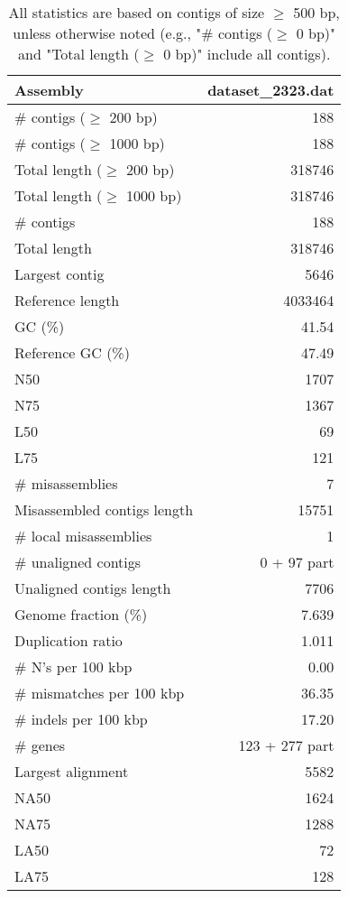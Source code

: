 \documentclass[12pt,a4paper]{article}
\begin{document}
\begin{table}[ht]
\begin{center}
\caption{All statistics are based on contigs of size $\geq$ 500 bp, unless otherwise noted (e.g., "\# contigs ($\geq$ 0 bp)" and "Total length ($\geq$ 0 bp)" include all contigs).}
\begin{tabular}{|l*{1}{|r}|}
\hline
Assembly & dataset\_2323.dat \\ \hline
\# contigs ($\geq$ 200 bp) & 188 \\ \hline
\# contigs ($\geq$ 1000 bp) & 188 \\ \hline
Total length ($\geq$ 200 bp) & 318746 \\ \hline
Total length ($\geq$ 1000 bp) & 318746 \\ \hline
\# contigs & 188 \\ \hline
Total length & 318746 \\ \hline
Largest contig & 5646 \\ \hline
Reference length & 4033464 \\ \hline
GC (\%) & 41.54 \\ \hline
Reference GC (\%) & 47.49 \\ \hline
N50 & 1707 \\ \hline
N75 & 1367 \\ \hline
L50 & 69 \\ \hline
L75 & 121 \\ \hline
\# misassemblies & 7 \\ \hline
Misassembled contigs length & 15751 \\ \hline
\# local misassemblies & 1 \\ \hline
\# unaligned contigs & 0 + 97 part \\ \hline
Unaligned contigs length & 7706 \\ \hline
Genome fraction (\%) & 7.639 \\ \hline
Duplication ratio & 1.011 \\ \hline
\# N's per 100 kbp & 0.00 \\ \hline
\# mismatches per 100 kbp & 36.35 \\ \hline
\# indels per 100 kbp & 17.20 \\ \hline
\# genes & 123 + 277 part \\ \hline
Largest alignment & 5582 \\ \hline
NA50 & 1624 \\ \hline
NA75 & 1288 \\ \hline
LA50 & 72 \\ \hline
LA75 & 128 \\ \hline
\end{tabular}
\end{center}
\end{table}
\end{document}
